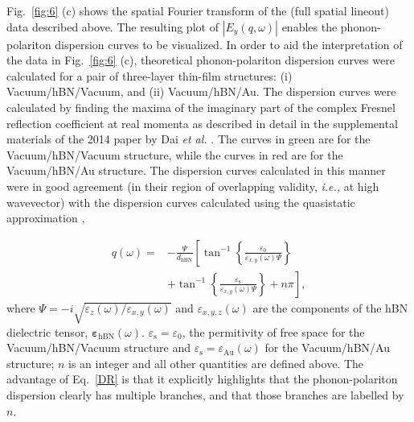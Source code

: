 \documentclass[reprint,
amsmath,amssymb,
aip,
jap,
floatfix,]{revtex4-2}
\begin{document}
			Fig.~\ref{fig:6} (c) shows the spatial Fourier transform of the (full spatial lineout) data described above. The resulting plot of $|E_y(q,\omega)|$ enables the phonon-polariton dispersion curves to be visualized. In order to aid the interpretation of the data in Fig.~\ref{fig:6} (c), theoretical phonon-polariton dispersion curves were calculated for a pair of three-layer thin-film structures: (i) Vacuum/hBN/Vacuum, and (ii) Vacuum/hBN/Au. The dispersion curves were calculated by finding the maxima of the imaginary part of the complex Fresnel reflection coefficient at real momenta as described in detail in the supplemental materials of the 2014 paper by Dai \textit{et al.} \cite{Dai:14}. The curves in green are for the  Vacuum/hBN/Vacuum structure, while the curves in red are for the Vacuum/hBN/Au structure. The dispersion curves calculated in this manner were in good agreement (in their region of overlapping validity, \textit{i.e.,} at high wavevector) with the dispersion curves calculated using the quasistatic approximation \cite{Dai:14, Kumar:15}, 
			
			\begin{align}
			  q(\omega)   = & -  \frac{\Psi}{d_\mathrm{hBN}} \left[  
			    \tan^{-1} \left\{ \frac{\varepsilon_0}{\varepsilon_{x,y}(\omega)\Psi} \right\} \right. \nonumber\\
			     & +  \left. \tan^{-1} \left\{ \frac{\varepsilon_\mathrm{s}}{\varepsilon_{x,y}(\omega)\Psi} \right\} + n\pi \right],
			  \label{DR}
			\end{align}
			\noindent where $\Psi = -i\sqrt{\varepsilon_z(\omega)/\varepsilon_{x,y}(\omega)}$ and $\varepsilon_{x,y,z}(\omega)$ are the components of the hBN dielectric tensor, $\bm{\varepsilon}_\mathrm{hBN}(\omega)$. $\varepsilon_\mathrm{s} = \varepsilon_0$, the permitivity of free space for the Vacuum/hBN/Vacuum structure and $\varepsilon_\mathrm{s} = \varepsilon_\mathrm{Au}(\omega)$ for the Vacuum/hBN/Au structure; $n$ is an integer and all other quantities are defined above. The advantage of Eq.~\ref{DR} is that it explicitly highlights that the phonon-polariton dispersion clearly has multiple branches, and that those branches are labelled by $n$.

			

\end{document}
